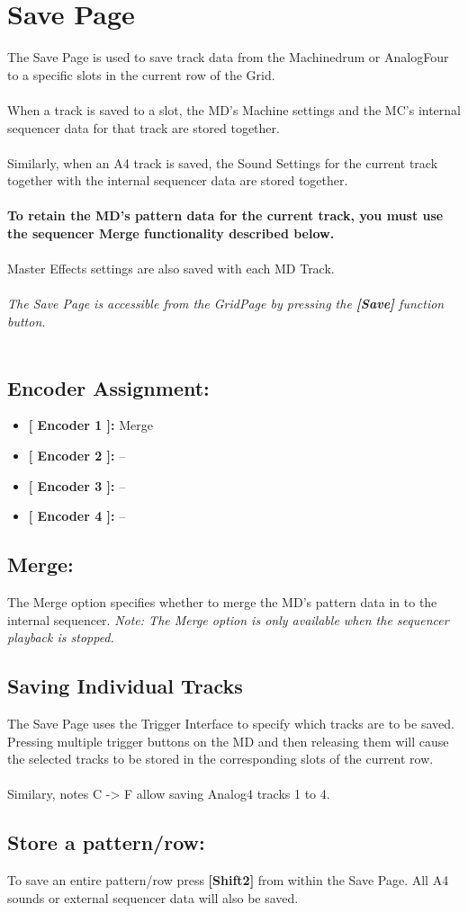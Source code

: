 \chapter{Save Page}

The Save Page is used to save track data from the Machinedrum or AnalogFour to a specific slots in the current row of the Grid.\\
\\
When a track is saved to a slot, the MD's Machine settings and the MC's internal sequencer data for that track are stored together.\\
\\
Similarly, when an A4 track is saved, the Sound Settings for the current track together with the internal sequencer data are stored together.\\
\\
\textbf{To retain the MD's pattern data for the current track, you must use the sequencer Merge functionality described below.}\\
\\
Master Effects settings are also saved with each MD Track.
\\\\
\textit{The Save Page is accessible from the GridPage by pressing the  \textbf{[Save]} function button.}
\\\\
\section{Encoder Assignment:}
\begin{itemize}
	\item \textbf{[ Encoder 1 ]: }Merge
	\item \textbf{[ Encoder 2 ]: }--
	\item \textbf{[ Encoder 3 ]: }--
	\item \textbf{[ Encoder 4 ]: }--
\end{itemize}
\section{Merge:}
The Merge option specifies whether to merge the MD's pattern data in to the internal sequencer. \textit{Note: The Merge option is only available when the sequencer playback is stopped.}
\section{Saving Individual Tracks}
The Save Page uses the Trigger Interface to specify which tracks are to be saved. Pressing multiple trigger buttons on the MD and then releasing them will cause the selected tracks to be stored in the corresponding slots of the current row.\\ \\
Similary, notes C -> F allow saving Analog4 tracks 1 to 4.
\section{Store a pattern/row:}
To save an entire pattern/row press \textbf{[Shift2]} from within the Save Page. All A4 sounds or external sequencer data will also be saved.\\



